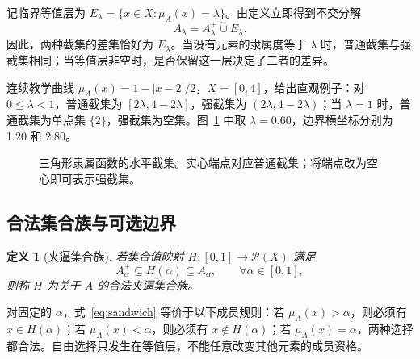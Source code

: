 \documentclass[UTF8,fontset=fandol,zihao=-4,a4paper]{ctexart}
\numberwithin{equation}{section}
\theoremstyle{reportplain}
\newtheorem{definition}[theorem]{定义}
\newcommand{\Pow}{\mathcal P}
\newcommand{\muA}{\mu_A}
\newcommand{\cut}[1]{A_{#1}}
\newcommand{\scut}[1]{A_{#1}^{+}}
\newcommand{\set}[1]{\{#1\}}
\newcommand{\eqtag}[1]{\label{#1}}
\begin{document}
记临界等值层为 $E_\lambda=\set{x\in X:\muA(x)=\lambda}$。由定义立即得到不交分解
\begin{equation}
\cut{\lambda}=\scut{\lambda}\mathbin{\dot\cup}E_\lambda.
\eqtag{eq:boundary}
\end{equation}
因此，两种截集的差集恰好为 $E_\lambda$。当没有元素的隶属度等于 $\lambda$ 时，普通截集与强截集相同；当等值层非空时，是否保留这一层决定了二者的差异。

连续教学曲线 $\muA(x)=1-|x-2|/2$，$X=[0,4]$，给出直观例子：对 $0\le\lambda<1$，普通截集为 $[2\lambda,4-2\lambda]$，强截集为 $(2\lambda,4-2\lambda)$；当 $\lambda=1$ 时，普通截集为单点集 $\set{2}$，强截集为空集。图~\ref{fig:cuts} 中取 $\lambda=0.60$，边界横坐标分别为 1.20 和 2.80。

\begin{figure}[htbp]
\centering
{}
\caption{三角形隶属函数的水平截集。实心端点对应普通截集；将端点改为空心即可表示强截集。}
\label{fig:cuts}
\end{figure}

\subsection{合法集合族与可选边界}
\begin{definition}[夹逼集合族]
若集合值映射 $H:[0,1]\to\Pow(X)$ 满足
\begin{equation}
\scut{\alpha}\subseteq H(\alpha)\subseteq\cut{\alpha},
\qquad\forall\alpha\in[0,1],
\eqtag{eq:sandwich}
\end{equation}
则称 $H$ 为关于 $A$ 的合法夹逼集合族。
\end{definition}

对固定的 $\alpha$，式~\eqref{eq:sandwich} 等价于以下成员规则：若 $\muA(x)>\alpha$，则必须有 $x\in H(\alpha)$；若 $\muA(x)<\alpha$，则必须有 $x\notin H(\alpha)$；若 $\muA(x)=\alpha$，两种选择都合法。自由选择只发生在等值层，不能任意改变其他元素的成员资格。
\end{document}
